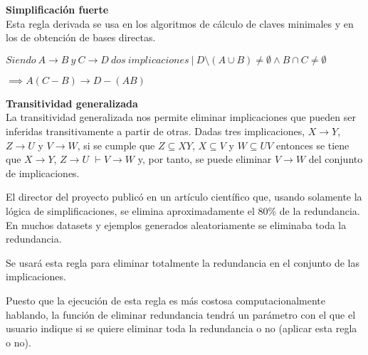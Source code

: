 % 
\textbf{Simplificaci\'on fuerte}\\

Esta regla derivada se usa en los algoritmos de c\'alculo de claves minimales y en los de obtenci\'on de bases directas. 
\begin{center}
    \(Siendo \ A \to B \ y \ C\to D \ dos \ implicaciones \ | \ D \setminus (A \cup B) \neq \emptyset \wedge B \cap C \neq \emptyset\)
\end{center}

\begin{center}
    \(\implies A(C-B) \to D - (AB)\)
\end{center}


\bigskip

\textbf{Transitividad generalizada}\\

La transitividad generalizada nos permite eliminar implicaciones que pueden ser inferidas transitivamente a partir de otras. Dadas tres implicaciones, \(X \to Y\), \(Z \to U\) y \(V \to W\), si se cumple que \(Z \subseteq XY \), \( X \subseteq V \) y \( W \subseteq UV \) entonces se tiene que  \(X \to Y\), \(Z \to U\) \( \vdash V \to W\) y, por tanto, se puede eliminar \(V \to W\) del conjunto de implicaciones.

El director del proyecto public\'o en un art\'iculo cient\'ifico que, usando solamente la l\'ogica de simplificaciones, se elimina aproximadamente el 80\% de la redundancia. En muchos datasets y ejemplos generados aleatoriamente se eliminaba toda la redundancia. 

Se usar\'a esta regla para eliminar totalmente la redundancia en el conjunto de las implicaciones. 

Puesto que la ejecuci\'on de esta regla es m\'as costosa computacionalmente hablando, la funci\'on de eliminar redundancia tendr\'a un par\'ametro con el que el usuario indique si se quiere eliminar toda la redundancia o no (aplicar esta regla o no).\\

\newpage

\newpage
